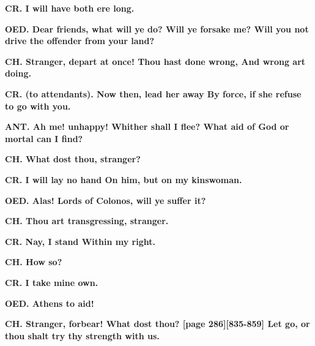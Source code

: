 \documentclass[11pt,letter]{book}
\begin{document}
\par \textbf{CR. I will have both ere long.}
\par 

\par \textbf{OED. Dear friends, what will ye do? Will ye forsake me? Will you not drive the offender from your land?}
\par 

\par \textbf{CH. Stranger, depart at once! Thou hast done wrong, And wrong art doing.}
\par 

\par \textbf{CR. (to attendants). Now then, lead her away By force, if she refuse to go with you.}
\par 

\par \textbf{ANT. Ah me! unhappy! Whither shall I flee? What aid of God or mortal can I find?}
\par 

\par \textbf{CH. What dost thou, stranger?}
\par 

\par \textbf{CR. I will lay no hand On him, but on my kinswoman.}
\par 

\par \textbf{OED. Alas! Lords of Colonos, will ye suffer it?}
\par 

\par \textbf{CH. Thou art transgressing, stranger.}
\par 

\par \textbf{CR. Nay, I stand Within my right.}
\par 

\par \textbf{CH. How so?}
\par 

\par \textbf{CR. I take mine own.}
\par 

\par \textbf{OED. Athens to aid!}
\par 

\par \textbf{CH. Stranger, forbear! What dost thou? [page 286][835-859] Let go, or thou shalt try thy strength with us.}
\par 
\end{document}

